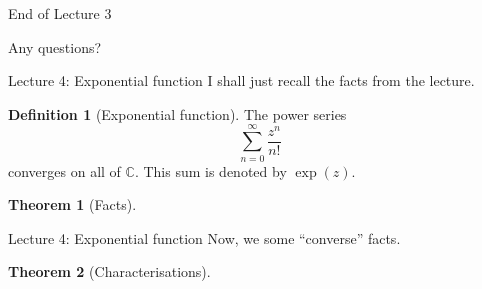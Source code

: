 \documentclass[dvipsnames]{beamer}
\theoremstyle{definition}
\newtheorem{defn}{Definition}
\newtheorem{thm}{Theorem}
\begin{document}
\begin{frame}{End of Lecture 3}
    \begin{tcolorbox}
        Any questions?
    \end{tcolorbox}
\end{frame}

\begin{frame}{Lecture 4: Exponential function}
    I shall just recall the facts from the lecture.
    \begin{defn}[Exponential function]
        The power series
        \begin{equation*} 
            \sum_{n = 0}^{\infty}\dfrac{z^n}{n!}
        \end{equation*}
        converges on all of $\mathbb{C}.$ This sum is denoted by $\exp(z).$
    \end{defn}
    \begin{thm}[Facts]
        \begin{enumerate}
        \end{enumerate}
    \end{thm}
\end{frame}
\begin{frame}{Lecture 4: Exponential function}
    Now, we some ``converse'' facts.
    \begin{thm}[Characterisations]
        \begin{enumerate}
        \end{enumerate}
    \end{thm}
\end{frame}
\end{document}
